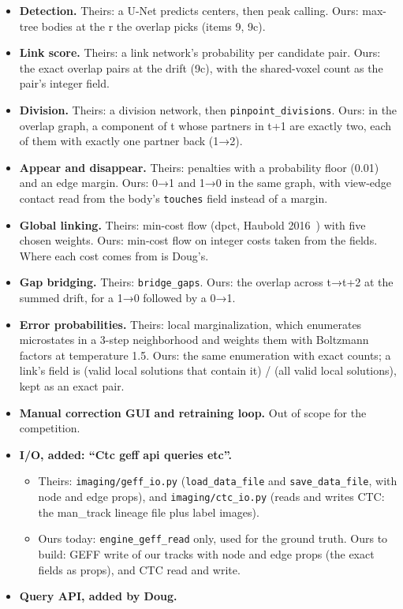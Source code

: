\begin{itemize}
\item \textbf{Detection.} Theirs: a U-Net predicts centers, then peak calling. Ours: max-tree bodies at the r the overlap picks (items 9, 9c).
\item \textbf{Link score.} Theirs: a link network's probability per candidate pair. Ours: the exact overlap pairs at the drift (9c), with the shared-voxel count as the pair's integer field.
\item \textbf{Division.} Theirs: a division network, then \texttt{pinpoint\_\allowbreak{}divisions}. Ours: in the overlap graph, a component of t whose partners in t+1 are exactly two, each of them with exactly one partner back (1→2).
\item \textbf{Appear and disappear.} Theirs: penalties with a probability floor (0.01) and an edge margin. Ours: 0→1 and 1→0 in the same graph, with view-edge contact read from the body's \texttt{touches} field instead of a margin.
\item \textbf{Global linking.} Theirs: min-cost flow (dpct, Haubold 2016~\cite{src:Haubold-2016}) with five chosen weights. Ours: min-cost flow on integer costs taken from the fields. Where each cost comes from is Doug's.
\item \textbf{Gap bridging.} Theirs: \texttt{bridge\_\allowbreak{}gaps}. Ours: the overlap across t→t+2 at the summed drift, for a 1→0 followed by a 0→1.
\item \textbf{Error probabilities.} Theirs: local marginalization, which enumerates microstates in a 3-step neighborhood and weights them with Boltzmann factors at temperature 1.5. Ours: the same enumeration with exact counts; a link's field is (valid local solutions that contain it) / (all valid local solutions), kept as an exact pair.
\item \textbf{Manual correction GUI and retraining loop.} Out of scope for the competition.
\item \textbf{I/O, added: “Ctc geff api queries etc”.}

\begin{itemize}
\item Theirs: \texttt{imaging/\allowbreak{}geff\_\allowbreak{}io.\allowbreak{}py} (\texttt{load\_\allowbreak{}data\_\allowbreak{}file} and \texttt{save\_\allowbreak{}data\_\allowbreak{}file}, with node and edge props), and \texttt{imaging/\allowbreak{}ctc\_\allowbreak{}io.\allowbreak{}py} (reads and writes CTC: the man\_\allowbreak{}track lineage file plus label images).
\item Ours today: \texttt{engine\_\allowbreak{}geff\_\allowbreak{}read} only, used for the ground truth. Ours to build: GEFF write of our tracks with node and edge props (the exact fields as props), and CTC read and write.
\end{itemize}
\item \textbf{Query API, added by Doug.}


\end{itemize}
